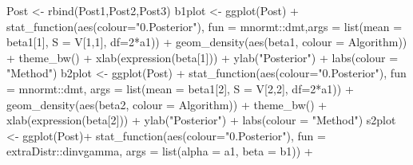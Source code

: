\documentclass[
]{book}
\newenvironment{Shaded}{\begin{snugshade}}{\end{snugshade}}
\newcommand{\AttributeTok}[1]{\textcolor[rgb]{0.77,0.63,0.00}{#1}}
\newcommand{\DecValTok}[1]{\textcolor[rgb]{0.00,0.00,0.81}{#1}}
\newcommand{\FunctionTok}[1]{\textcolor[rgb]{0.00,0.00,0.00}{#1}}
\newcommand{\NormalTok}[1]{#1}
\newcommand{\OtherTok}[1]{\textcolor[rgb]{0.56,0.35,0.01}{#1}}
\newcommand{\SpecialCharTok}[1]{\textcolor[rgb]{0.00,0.00,0.00}{#1}}
\newcommand{\StringTok}[1]{\textcolor[rgb]{0.31,0.60,0.02}{#1}}
\begin{document}
\begin{Shaded}
\begin{Highlighting}[]
\NormalTok{Post }\OtherTok{\textless{}{-}} \FunctionTok{rbind}\NormalTok{(Post1,Post2,Post3)}
\NormalTok{b1plot }\OtherTok{\textless{}{-}} \FunctionTok{ggplot}\NormalTok{(Post) }\SpecialCharTok{+}
  \FunctionTok{stat\_function}\NormalTok{(}\FunctionTok{aes}\NormalTok{(}\AttributeTok{colour=}\StringTok{"0.Posterior"}\NormalTok{), }\AttributeTok{fun =}\NormalTok{ mnormt}\SpecialCharTok{::}\NormalTok{dmt,}\AttributeTok{args =} \FunctionTok{list}\NormalTok{(}\AttributeTok{mean =}\NormalTok{ beta1[}\DecValTok{1}\NormalTok{], }\AttributeTok{S =}\NormalTok{ V[}\DecValTok{1}\NormalTok{,}\DecValTok{1}\NormalTok{], }\AttributeTok{df=}\DecValTok{2}\SpecialCharTok{*}\NormalTok{a1)) }\SpecialCharTok{+}
  \FunctionTok{geom\_density}\NormalTok{(}\FunctionTok{aes}\NormalTok{(beta1, }\AttributeTok{colour =}\NormalTok{ Algorithm)) }\SpecialCharTok{+} \FunctionTok{theme\_bw}\NormalTok{() }\SpecialCharTok{+}
  \FunctionTok{xlab}\NormalTok{(}\FunctionTok{expression}\NormalTok{(beta[}\DecValTok{1}\NormalTok{])) }\SpecialCharTok{+} \FunctionTok{ylab}\NormalTok{(}\StringTok{"Posterior"}\NormalTok{) }\SpecialCharTok{+} \FunctionTok{labs}\NormalTok{(}\AttributeTok{colour =} \StringTok{"Method"}\NormalTok{)}
\NormalTok{b2plot }\OtherTok{\textless{}{-}} \FunctionTok{ggplot}\NormalTok{(Post) }\SpecialCharTok{+}
  \FunctionTok{stat\_function}\NormalTok{(}\FunctionTok{aes}\NormalTok{(}\AttributeTok{colour=}\StringTok{"0.Posterior"}\NormalTok{), }\AttributeTok{fun =}\NormalTok{ mnormt}\SpecialCharTok{::}\NormalTok{dmt, }\AttributeTok{args =} \FunctionTok{list}\NormalTok{(}\AttributeTok{mean =}\NormalTok{ beta1[}\DecValTok{2}\NormalTok{], }\AttributeTok{S =}\NormalTok{ V[}\DecValTok{2}\NormalTok{,}\DecValTok{2}\NormalTok{], }\AttributeTok{df=}\DecValTok{2}\SpecialCharTok{*}\NormalTok{a1)) }\SpecialCharTok{+}
  \FunctionTok{geom\_density}\NormalTok{(}\FunctionTok{aes}\NormalTok{(beta2, }\AttributeTok{colour =}\NormalTok{ Algorithm)) }\SpecialCharTok{+} \FunctionTok{theme\_bw}\NormalTok{() }\SpecialCharTok{+}
  \FunctionTok{xlab}\NormalTok{(}\FunctionTok{expression}\NormalTok{(beta[}\DecValTok{2}\NormalTok{])) }\SpecialCharTok{+} \FunctionTok{ylab}\NormalTok{(}\StringTok{"Posterior"}\NormalTok{) }\SpecialCharTok{+} \FunctionTok{labs}\NormalTok{(}\AttributeTok{colour =} \StringTok{"Method"}\NormalTok{)}
\NormalTok{s2plot }\OtherTok{\textless{}{-}} \FunctionTok{ggplot}\NormalTok{(Post)}\SpecialCharTok{+}
  \FunctionTok{stat\_function}\NormalTok{(}\FunctionTok{aes}\NormalTok{(}\AttributeTok{colour=}\StringTok{"0.Posterior"}\NormalTok{), }\AttributeTok{fun =}\NormalTok{ extraDistr}\SpecialCharTok{::}\NormalTok{dinvgamma, }\AttributeTok{args =} \FunctionTok{list}\NormalTok{(}\AttributeTok{alpha =}\NormalTok{ a1, }\AttributeTok{beta =}\NormalTok{ b1)) }\SpecialCharTok{+}

\end{Highlighting}
\end{Shaded}
\end{document}
